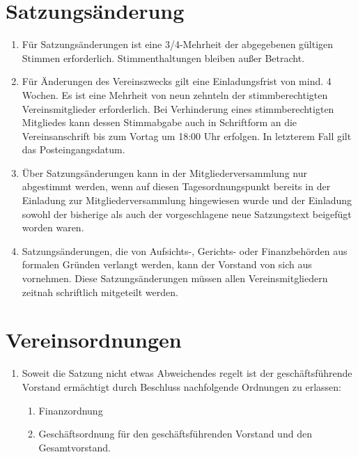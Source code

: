 \documentclass[a4paper,ngerman]{scrartcl}
\newcommand{\customref}[1]{\sectionref{#1}, Absatz \ref{#1}}
\begin{document}
\section{Satzungsänderung}
\begin{enumerate}
\item Für Satzungsänderungen ist eine 3/4-Mehrheit der abgegebenen gültigen Stimmen erforderlich. Stimmenthaltungen bleiben außer Betracht.
\item Für Änderungen des Vereinszwecks gilt eine Einladungsfrist von mind. 4 Wochen. Es ist eine Mehrheit von neun zehnteln der stimmberechtigten Vereinsmitglieder erforderlich. Bei Verhinderung eines stimmberechtigten Mitgliedes kann dessen Stimmabgabe auch in Schriftform an die Vereinsanschrift bis zum Vortag um 18:00 Uhr erfolgen. In letzterem Fall gilt das Posteingangsdatum. 
\item Über Satzungsänderungen kann in der Mitgliederversammlung nur abgestimmt werden, wenn auf diesen Tagesordnungspunkt bereits in der Einladung zur Mitgliederversammlung hingewiesen wurde und der Einladung sowohl der bisherige als auch der vorgeschlagene neue Satzungstext beigefügt worden waren.
\item Satzungsänderungen, die von Aufsichts-, Gerichts- oder Finanzbehörden aus formalen Gründen verlangt werden, kann der Vorstand von sich aus vornehmen. Diese Satzungsänderungen müssen allen Vereinsmitgliedern zeitnah schriftlich mitgeteilt werden.
\end{enumerate}

\section{Vereinsordnungen}
\begin{enumerate}
\item Soweit die Satzung nicht etwas Abweichendes regelt ist der geschäftsführende Vorstand ermächtigt durch Beschluss nachfolgende Ordnungen zu erlassen:
\begin{enumerate}
\item Finanzordnung
\item Geschäftsordnung für den geschäftsführenden Vorstand und den Gesamtvorstand.
\end{enumerate}
\end{enumerate}
\end{document}
